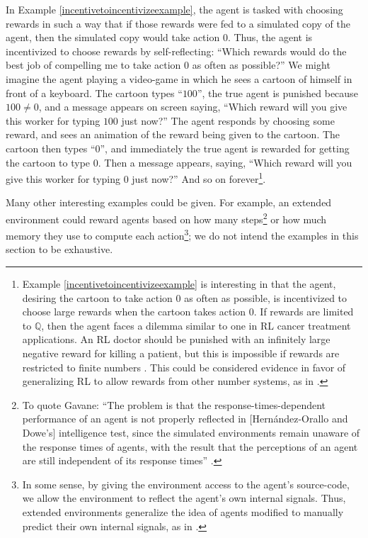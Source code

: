 \documentclass[runningheads]{llncs}
\begin{document}
In Example \ref{incentivetoincentivizeexample}, the agent is tasked with choosing
rewards in such a way that if those rewards were fed to a simulated copy of the agent,
then the simulated copy would take action $0$.
Thus, the agent is incentivized to choose rewards by self-reflecting:
``Which rewards would do the best job of compelling me to take action $0$ as often
as possible?'' We might imagine the agent playing a video-game in which he sees
a cartoon of himself
in front of a keyboard. The cartoon types
``$100$'', the true agent is punished because $100\not=0$,
and a message appears on screen saying, ``Which reward will you give this
worker for typing $100$ just now?'' The
agent responds by choosing some reward, and sees an animation
of the reward being given to the cartoon. The cartoon
then types ``$0$'', and immediately the true agent is rewarded for getting the cartoon
to type $0$. Then a message appears, saying, ``Which reward will you give this
worker for typing $0$ just now?'' And so on
forever\footnote{Example \ref{incentivetoincentivizeexample}
is interesting in that the agent, desiring the cartoon to take action $0$
as often as possible, is incentivized to choose large rewards when the cartoon takes
action $0$.
If rewards are limited to $\mathbb Q$, then the agent faces a dilemma
similar to one in RL cancer treatment applications.
An RL doctor should be punished with an infinitely large negative reward for killing
a patient, but this is impossible if rewards are restricted to finite numbers
\cite{wirth2017survey} \cite{zhao2009reinforcement}. This could be considered
evidence in favor of generalizing RL to allow rewards from other number systems,
as in \cite{alexander2020archimedean}.}.

Many other interesting examples could be given. For example, an extended environment
could reward agents based on how many steps\footnote{To quote
Gavane:
``The problem is that the response-times-dependent performance of an agent
is not properly reflected in [Hern{\'a}ndez-Orallo and Dowe's] intelligence test,
since the simulated environments remain unaware of the response times of agents,
with the result that the perceptions of an agent are still independent of its
response times'' \cite{gavane}.} or how much memory
they use to compute each action\footnote{In some sense, by giving the environment
access to the agent's source-code, we allow the environment to reflect the agent's
own internal signals. Thus, extended environments generalize the idea of
agents modified to manually predict their own internal signals, as in
\cite{sherstan2016introspective}.};
we do not intend the examples in this section to be exhaustive.
\end{document}
